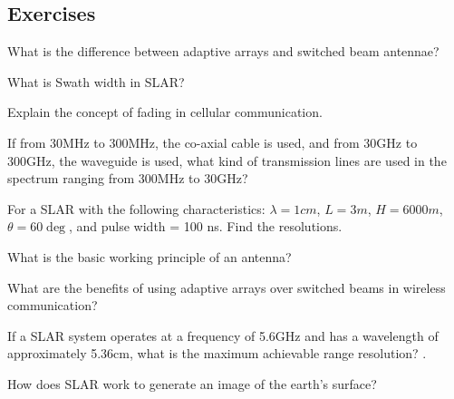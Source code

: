\begin{mdframed}[backgroundcolor=lightblue, linewidth=1pt, hidealllines=true]
\section*{Exercises}	
\begin{ExerciseList}
\Exercise[label={ex11}]
What is the difference between adaptive arrays and switched beam antennae?

\Exercise[label={ex12}]
What is Swath width in SLAR?

\Exercise[label={ex13}]
Explain the concept of fading in cellular communication.

\Exercise[label={ex14}]
If from 30MHz to 300MHz, the co-axial cable is used, and from 30GHz to 300GHz, the waveguide is used, what kind of transmission lines are used in the spectrum ranging from 300MHz to 30GHz?


\Exercise[label={ex15}]
For a SLAR with the following characteristics: $\lambda = 1cm$, $L = 3m$, $H = 6000m$,
$\theta = 60\deg$, and pulse width = 100 ns. 
Find the resolutions.


\Exercise[label={ex17}]
What is the basic working principle of an antenna?


\Exercise[label={ex19}]
What are the benefits of using adaptive arrays over switched beams in wireless communication?




\Exercise[label={ex22}]
If a SLAR system operates at a frequency of 5.6GHz and has a wavelength of approximately 5.36cm, what is the maximum achievable range resolution?
\Answer 2.68cm.



\Exercise[label={ex24}]
How does SLAR work to generate an image of the earth’s surface?

\end{ExerciseList}
\end{mdframed}
